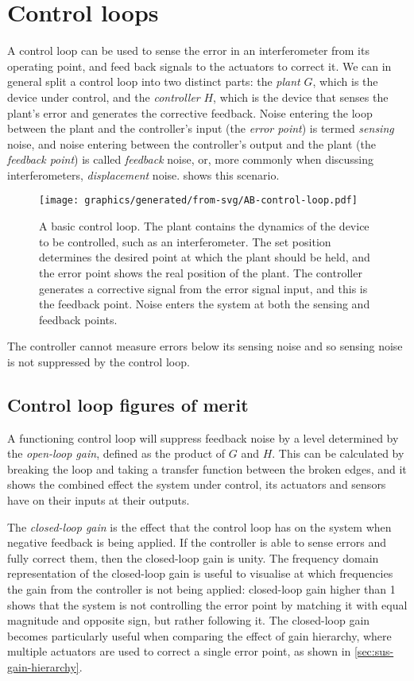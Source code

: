 \section{\label{sec:control-loops}Control loops}
A control loop can be used to sense the error in an interferometer from its operating point, and feed back signals to the actuators to correct it. We can in general split a control loop into two distinct parts: the \emph{plant} $G$, which is the device under control, and the \emph{controller} $H$, which is the device that senses the plant's error and generates the corrective feedback. Noise entering the loop between the plant and the controller's input (the \emph{error point}) is termed \emph{sensing} noise, and noise entering between the controller's output and the plant (the \emph{feedback point}) is called \emph{feedback} noise, or, more commonly when discussing interferometers, \emph{displacement} noise.  shows this scenario.

\begin{figure}
  \centering
  \texttt{[image: graphics/generated/from-svg/AB-control-loop.pdf]}
  \caption[A basic control loop]{\label{fig:control-loop}A basic control loop. The plant contains the dynamics of the device to be controlled, such as an interferometer. The set position determines the desired point at which the plant should be held, and the error point shows the real position of the plant. The controller generates a corrective signal from the error signal input, and this is the feedback point. Noise enters the system at both the sensing and feedback points.}
\end{figure}

The controller cannot measure errors below its sensing noise and so sensing noise is not suppressed by the control loop.

\subsection{Control loop figures of merit}
A functioning control loop will suppress feedback noise by a level determined by the \emph{open-loop gain}, defined as the product of $G$ and $H$. This can be calculated by breaking the loop and taking a transfer function between the broken edges, and it shows the combined effect the system under control, its actuators and sensors have on their inputs at their outputs.

The \emph{closed-loop gain} is the effect that the control loop has on the system when negative feedback is being applied. If the controller is able to sense errors and fully correct them, then the closed-loop gain is unity. The frequency domain representation of the closed-loop gain is useful to visualise at which frequencies the gain from the controller is not being applied: closed-loop gain higher than \num{1} shows that the system is not controlling the error point  by matching it with equal magnitude and opposite sign, but rather following it. The closed-loop gain becomes particularly useful when comparing the effect of gain hierarchy, where multiple actuators are used to correct a single error point, as shown in \cref{sec:sus-gain-hierarchy}.

